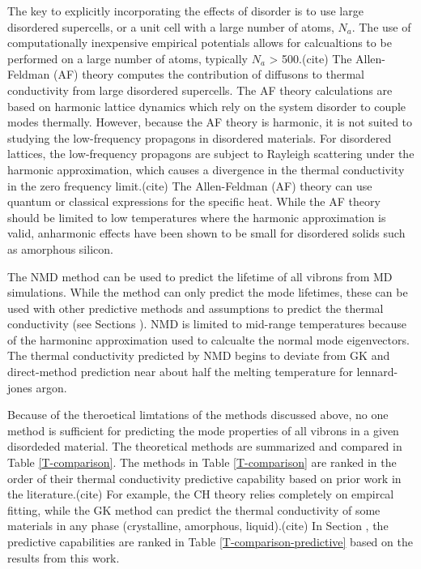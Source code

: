 The key to explicitly incorporating the effects of disorder 
is to use large disordered supercells, or a unit cell with a large 
number of atoms, $N_a$.  
The use of computationally 
inexpensive empirical potentials allows for calcualtions to be 
performed on a large number of atoms, typically $N_a$ > 500.(cite) 
The Allen-Feldman (AF) theory computes 
the contribution of diffusons 
to thermal conductivity from large disordered supercells.
\cite{allen_thermal_1993} 
The AF theory calculations are based on harmonic lattice dynamics which 
rely on the system disorder to couple modes thermally.
\cite{allen_thermal_1993,feldman_thermal_1993,feldman_numerical_1999} 
However, because the AF theory is harmonic, it is not suited to studying 
the low-frequency propagons in disordered materials. For disordered lattices, 
the low-frequency propagons are subject to Rayleigh scattering under the 
harmonic approximation, which 
causes a divergence in the thermal conductivity in the zero frequency 
limit.(cite)  
The Allen-Feldman (AF) theory can use quantum or classical expressions 
for the specific heat. While the AF theory should be limited to low 
temperatures where the harmonic approximation is valid, 
anharmonic effects have been shown to be 
small for disordered solids such as amorphous silicon.
\cite{feldman_thermal_1993}

The NMD method can be used to predict the lifetime of all vibrons from 
MD simulations.
\cite{bickham_calculation_1998,
bickham_numerical_1999,fabian_numerical_2003,
ladd_lattice_1986,mcgaughey_quantitative_2004,donadio_thermal_2007,
henry_spectral_2008,donadio_atomistic_2009,turney_predicting_2009,
goicochea_thermal_2010,he_morphology_2011,he_thermal_2011,he_heat_2011,
he_lattice_2012,sosso_thermal_2012,qiu_molecular_2012,wang_mode-wise_2013,
bao_first-principles_2013} 
While the method can only predict the 
mode lifetimes, these can be used with other predictive methods 
and assumptions to predict the thermal conductivity (see Sections ). 
NMD is limited to mid-range temperatures because of the harmoninc 
approximation used to calcualte the normal mode eigenvectors. 
The thermal conductivity predicted 
by NMD begins to deviate from GK and direct-method prediction 
near about half the melting temperature for lennard-jones argon.
\cite{turney_predicting_2009} 

Because of the theroetical limtations of the methods discussed above, 
no one method is sufficient for predicting the mode 
properties of all vibrons in a given disordeded material. The 
theoretical methods are summarized and compared in 
Table \ref{T-comparison}. 
The methods in Table \ref{T-comparison} are ranked in the order 
of their thermal conductivity predictive capability based on 
prior work in the literature.(cite) 
For example, the CH theory relies completely on empircal fitting, 
while the GK method can predict the thermal conductivity of some 
materials in any phase (crystalline, amorphous, liquid).(cite) 
In Section , the predictive capabilities are ranked in 
Table \ref{T-comparison-predictive} based on the results from 
this work.

